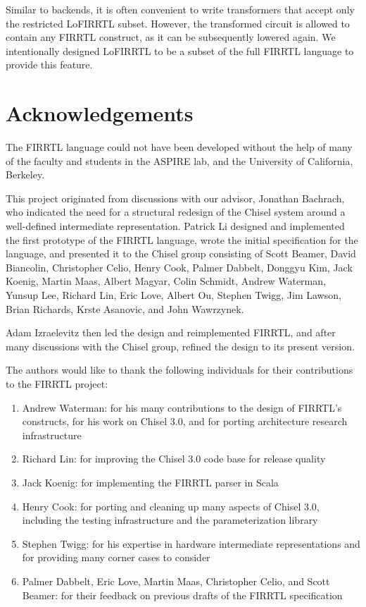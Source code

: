 \documentclass[12pt]{article}
\begin{document}
Similar to backends, it is often convenient to write transformers that accept only the restricted LoFIRRTL subset. However, the transformed circuit is allowed to contain any FIRRTL construct, as it can be subsequently lowered again. We intentionally designed LoFIRRTL to be a subset of the full FIRRTL language to provide this feature.

\section{Acknowledgements}
The FIRRTL language could not have been developed without the help of many of the faculty and students in the ASPIRE lab, and the University of California, Berkeley.

This project originated from discussions with our advisor, Jonathan Bachrach, who indicated the need for a structural redesign of the Chisel system around a well-defined intermediate representation. Patrick Li designed and implemented the first prototype of the FIRRTL language, wrote the initial specification for the language, and presented it to the Chisel group consisting of Scott Beamer, David Biancolin, Christopher Celio, Henry Cook, Palmer Dabbelt, Donggyu Kim, Jack Koenig, Martin Maas, Albert Magyar, Colin Schmidt, Andrew Waterman, Yunsup Lee, Richard Lin, Eric Love, Albert Ou, Stephen Twigg, Jim Lawson, Brian Richards, Krste Asanovic, and John Wawrzynek.

Adam Izraelevitz then led the design and reimplemented FIRRTL, and after many discussions with the Chisel group, refined the design to its present version.

The authors would like to thank the following individuals for their contributions to the FIRRTL project:
\begin{enumerate}
\item Andrew Waterman: for his many contributions to the design of FIRRTL's constructs, for his work on Chisel 3.0, and for porting architecture research infrastructure
\item Richard Lin: for improving the Chisel 3.0 code base for release quality
\item Jack Koenig: for implementing the FIRRTL parser in Scala
\item Henry Cook: for porting and cleaning up many aspects of Chisel 3.0, including the testing infrastructure and the parameterization library
\item Stephen Twigg: for his expertise in hardware intermediate representations and for providing many corner cases to consider
\item Palmer Dabbelt, Eric Love, Martin Maas, Christopher Celio, and Scott Beamer: for their feedback on previous drafts of the FIRRTL specification
\end{enumerate}
\end{document}
